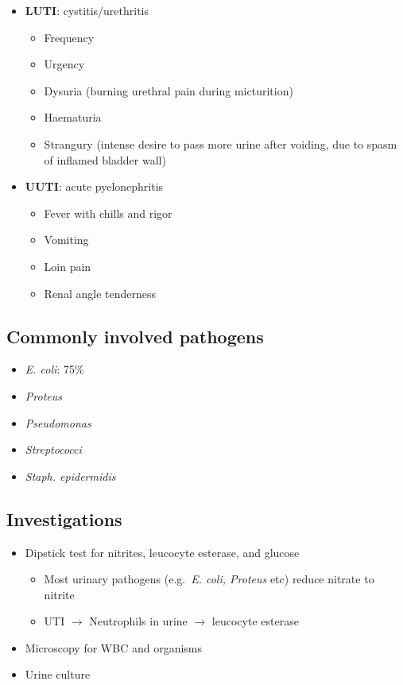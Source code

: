 \documentclass[
  12pt,
]{memoir}
\providecommand{\tightlist}{%
  \setlength{\itemsep}{0pt}\setlength{\parskip}{0pt}}
\begin{document}
\begin{itemize}
\tightlist
\item
  \textbf{LUTI}: cystitis/urethritis

  \begin{itemize}
  \tightlist
  \item
    Frequency
  \item
    Urgency
  \item
    Dysuria (burning urethral pain during micturition)
  \item
    Haematuria
  \item
    Strangury (intense desire to pass more urine after voiding, due to
    spasm of inflamed bladder wall)
  \end{itemize}
\item
  \textbf{UUTI}: acute pyelonephritis

  \begin{itemize}
  \tightlist
  \item
    Fever with chills and rigor
  \item
    Vomiting
  \item
    Loin pain
  \item
    Renal angle tenderness
  \end{itemize}
\end{itemize}

\hypertarget{commonly-involved-pathogens}{%
\subsection{Commonly involved
pathogens}\label{commonly-involved-pathogens}}

\begin{itemize}
\tightlist
\item
  \emph{E. coli}: 75\%
\item
  \emph{Proteus}
\item
  \emph{Pseudomonas}
\item
  \emph{Streptococci}
\item
  \emph{Staph. epidermidis}
\end{itemize}

\hypertarget{investigations-1}{%
\subsection{Investigations}\label{investigations-1}}

\begin{itemize}
\tightlist
\item
  Dipstick test for nitrites, leucocyte esterase, and glucose

  \begin{itemize}
  \tightlist
  \item
    Most urinary pathogens (e.g.~\emph{E. coli, Proteus} etc) reduce
    nitrate to nitrite
  \item
    UTI \(\rightarrow\) Neutrophils in urine \(\rightarrow\) leucocyte
    esterase
  \end{itemize}
\item
  Microscopy for WBC and organisms
\item
  Urine culture
\end{itemize}
\end{document}
